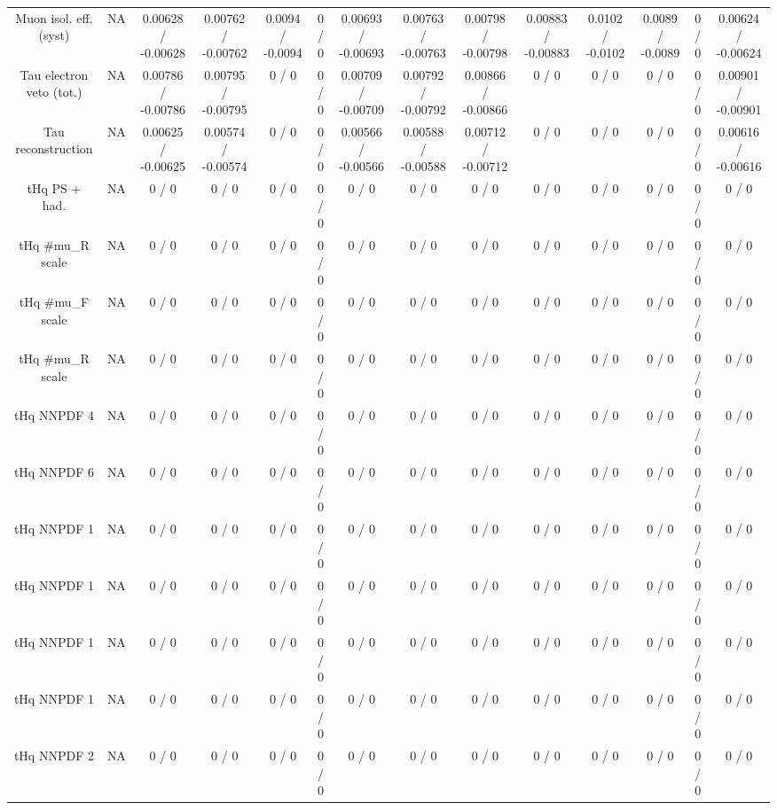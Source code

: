 \documentclass[10pt]{article}
\begin{document}
\begin{table}[htbp]
\begin{center}
\begin{tabular}{|c|c|c|c|c|c|c|c|c|c|c|c|c|c|}
  Muon isol. eff. (syst) &    NA    & 0.00628 / -0.00628 & 0.00762 / -0.00762 & 0.0094 / -0.0094 & 0 / 0 & 0.00693 / -0.00693 & 0.00763 / -0.00763 & 0.00798 / -0.00798 & 0.00883 / -0.00883 & 0.0102 / -0.0102 & 0.0089 / -0.0089 & 0 / 0 & 0.00624 / -0.00624 \\ 
  Tau electron veto (tot.) &    NA    & 0.00786 / -0.00786 & 0.00795 / -0.00795 & 0 / 0 & 0 / 0 & 0.00709 / -0.00709 & 0.00792 / -0.00792 & 0.00866 / -0.00866 & 0 / 0 & 0 / 0 & 0 / 0 & 0 / 0 & 0.00901 / -0.00901 \\ 
  Tau reconstruction &    NA    & 0.00625 / -0.00625 & 0.00574 / -0.00574 & 0 / 0 & 0 / 0 & 0.00566 / -0.00566 & 0.00588 / -0.00588 & 0.00712 / -0.00712 & 0 / 0 & 0 / 0 & 0 / 0 & 0 / 0 & 0.00616 / -0.00616 \\ 
  tHq PS + had. &    NA    & 0 / 0 & 0 / 0 & 0 / 0 & 0 / 0 & 0 / 0 & 0 / 0 & 0 / 0 & 0 / 0 & 0 / 0 & 0 / 0 & 0 / 0 & 0 / 0 \\ 
  tHq #mu_{R} scale &    NA    & 0 / 0 & 0 / 0 & 0 / 0 & 0 / 0 & 0 / 0 & 0 / 0 & 0 / 0 & 0 / 0 & 0 / 0 & 0 / 0 & 0 / 0 & 0 / 0 \\ 
  tHq #mu_{F} scale &    NA    & 0 / 0 & 0 / 0 & 0 / 0 & 0 / 0 & 0 / 0 & 0 / 0 & 0 / 0 & 0 / 0 & 0 / 0 & 0 / 0 & 0 / 0 & 0 / 0 \\ 
  tHq #mu_{R} scale &    NA    & 0 / 0 & 0 / 0 & 0 / 0 & 0 / 0 & 0 / 0 & 0 / 0 & 0 / 0 & 0 / 0 & 0 / 0 & 0 / 0 & 0 / 0 & 0 / 0 \\ 
  tHq NNPDF 4 &    NA    & 0 / 0 & 0 / 0 & 0 / 0 & 0 / 0 & 0 / 0 & 0 / 0 & 0 / 0 & 0 / 0 & 0 / 0 & 0 / 0 & 0 / 0 & 0 / 0 \\ 
  tHq NNPDF 6 &    NA    & 0 / 0 & 0 / 0 & 0 / 0 & 0 / 0 & 0 / 0 & 0 / 0 & 0 / 0 & 0 / 0 & 0 / 0 & 0 / 0 & 0 / 0 & 0 / 0 \\ 
  tHq NNPDF 1 &    NA    & 0 / 0 & 0 / 0 & 0 / 0 & 0 / 0 & 0 / 0 & 0 / 0 & 0 / 0 & 0 / 0 & 0 / 0 & 0 / 0 & 0 / 0 & 0 / 0 \\ 
  tHq NNPDF 1 &    NA    & 0 / 0 & 0 / 0 & 0 / 0 & 0 / 0 & 0 / 0 & 0 / 0 & 0 / 0 & 0 / 0 & 0 / 0 & 0 / 0 & 0 / 0 & 0 / 0 \\ 
  tHq NNPDF 1 &    NA    & 0 / 0 & 0 / 0 & 0 / 0 & 0 / 0 & 0 / 0 & 0 / 0 & 0 / 0 & 0 / 0 & 0 / 0 & 0 / 0 & 0 / 0 & 0 / 0 \\ 
  tHq NNPDF 1 &    NA    & 0 / 0 & 0 / 0 & 0 / 0 & 0 / 0 & 0 / 0 & 0 / 0 & 0 / 0 & 0 / 0 & 0 / 0 & 0 / 0 & 0 / 0 & 0 / 0 \\ 
  tHq NNPDF 2 &    NA    & 0 / 0 & 0 / 0 & 0 / 0 & 0 / 0 & 0 / 0 & 0 / 0 & 0 / 0 & 0 / 0 & 0 / 0 & 0 / 0 & 0 / 0 & 0 / 0 \\ 

\end{tabular}
\end{center}
\end{table}
\end{document}
